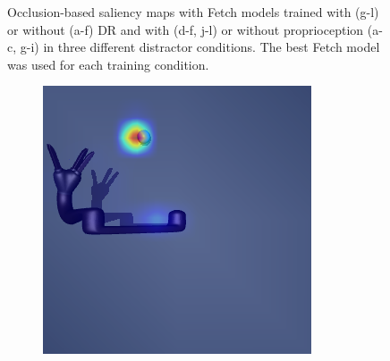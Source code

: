 \begin{figure}
\begin{subfigure}{0.24\columnwidth}
  \end{subfigure}
  \caption{Occlusion-based saliency maps with Fetch models trained with (g-l) or without (a-f) DR and with (d-f, j-l) or without proprioception (a-c, g-i) in three different distractor conditions. The best Fetch model was used for each training condition.}
  \label{fig:saliency_fetch_distractor}
\end{figure}

\begin{figure}
  \centering
  \begin{subfigure}{0.24\columnwidth}
    \includegraphics[width=\linewidth]{figures/chapter6/distractor_saliency_jaco_pro_off/standard_visual_std}
  \end{subfigure}
  \begin{subfigure}{0.24\columnwidth}

\end{subfigure}
\end{figure}
